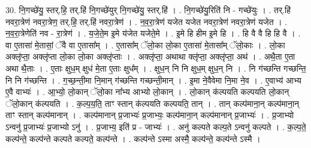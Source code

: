 \documentclass[17pt]{extarticle}
\begin{document}
30. नि॒गच्छे॑यु॒ स्तर्.हि॒ तर्.हि॑ नि॒गच्छे॑युर् नि॒गच्छे॑यु॒ स्तर्.हि॑ । . नि॒गच्छे॑यु॒रिति॑ नि - गच्छे॑युः । . तर्.हि॑ नवरा॒त्रेण॑ नवरा॒त्रेण॒ तर्.हि॒ तर्.हि॑ नवरा॒त्रेण॑ । . न॒व॒रा॒त्रेण॑ यजेत यजेत नवरा॒त्रेण॑ नवरा॒त्रेण॑ यजेत । . न॒व॒रा॒त्रेणेति॑ नव - रा॒त्रेण॑ । . य॒जे॒ते॒म इ॒मे य॑जेत यजेते॒मे । . इ॒मे हि हीम इ॒मे हि । . हि वै वै हि हि वै । . वा ए॒तासा॑ मे॒तासां॒ ॅवै वा ए॒तासा᳚म् । . ए॒तासा᳚म् ॅलो॒का लो॒का ए॒तासा॑ मे॒तासा᳚म् ॅलो॒काः । . लो॒का अक्लृ॑प्ता॒ अक्लृ॑प्ता लो॒का लो॒का अक्लृ॑प्ताः । . अक्लृ॑प्ता॒ अथाथा क्लृ॑प्ता॒ अक्लृ॑प्ता॒ अथ॑ । . अथै॒ता ए॒ता अथा थै॒ताः । . ए॒ताः क्षुध॒म् क्षुध॑ मे॒ता ए॒ताः क्षुध᳚म् । . क्षुध॒न् नि नि क्षुध॒म् क्षुध॒न् नि । . नि ग॑च्छन्ति गच्छन्ति॒ नि नि ग॑च्छन्ति । . ग॒च्छ॒न्ती॒मा नि॒मान् ग॑च्छन्ति गच्छन्ती॒मान् । . इ॒मा ने॒वैवेमा नि॒मा ने॒व । . ए॒वाभ्य॑ आभ्य ए॒वै वाभ्यः॑ । . आ॒भ्यो॒ लो॒कान् ॅलो॒का ना᳚भ्य आभ्यो लो॒कान् । . लो॒कान् क॑ल्पयति कल्पयति लो॒कान् ॅलो॒कान् क॑ल्पयति । . क॒ल्प॒य॒ति॒ ताꣳ स्तान् क॑ल्पयति कल्पयति॒ तान् । . तान् कल्प॑माना॒न् कल्प॑माना॒न् ताꣳ स्तान् कल्प॑मानान् । . कल्प॑मानान् प्र॒जाभ्यः॑ प्र॒जाभ्यः॒ कल्प॑माना॒न् कल्प॑मानान् प्र॒जाभ्यः॑ । . प्र॒जाभ्यो ऽन्वनु॑ प्र॒जाभ्यः॑ प्र॒जाभ्यो ऽनु॑ । . प्र॒जाभ्य॒ इति॑ प्र - जाभ्यः॑ । . अनु॑ कल्पते कल्प॒ते ऽन्वनु॑ कल्पते । . क॒ल्प॒ते॒ कल्प॑न्ते॒ कल्प॑न्ते कल्पते कल्पते॒ कल्प॑न्ते । . कल्प॑न्ते ऽस्मा अस्मै॒ कल्प॑न्ते॒ कल्प॑न्ते ऽस्मै । \newline
\end{document}

